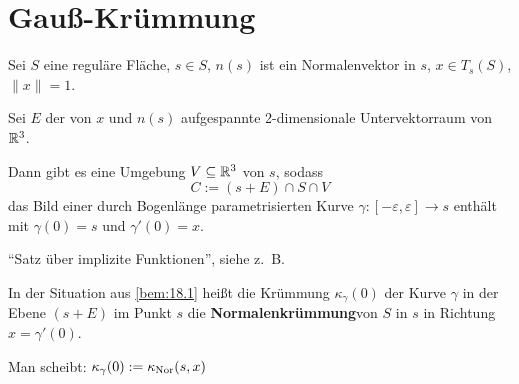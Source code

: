 \section{Gauß-Krümmung}
\begin{bemerkung}\label{bem:18.1}%
    Sei $S$ eine reguläre Fläche, $s \in S$, $n(s)$ ist ein Normalenvektor
    in $s$, $x \in T_s (S)$, $\|x\| = 1$.

    Sei $E$ der von $x$ und $n(s)$ aufgespannte 2-dimensionale 
    Untervektorraum von $\mathbb{R}^3$.

    Dann gibt es eine Umgebung $V \subseteq \mathbb{R}^3$ von $s$, sodass
    \[C := (s + E) \cap S \cap V\]
    das Bild einer durch Bogenlänge parametrisierten Kurve
    $\gamma:[-\varepsilon, \varepsilon] \rightarrow s$ enthält mit
    $\gamma(0) = s$ und $\gamma'(0) = x$.
\end{bemerkung}

\begin{beweis}
    \enquote{Satz über implizite Funktionen}, siehe z.~B. 
    \href{https://github.com/MartinThoma/LaTeX-examples/tree/master/documents/Analysis\%20II}{}
\end{beweis}

\begin{definition}%
    In der Situation aus \cref{bem:18.1} heißt die Krümmung $\kappa_\gamma(0)$
    der Kurve $\gamma$ in der Ebene $(s+ E)$ im Punkt $s$ die
    \textbf{Normalenkrümmung}\footnotemark von $S$ in $s$ in Richtung
    $x = \gamma'(0)$.

    Man scheibt: $\kappa_\gamma(0) := \kappa_{\textnormal{Nor}}(s, x)$
\end{definition}

